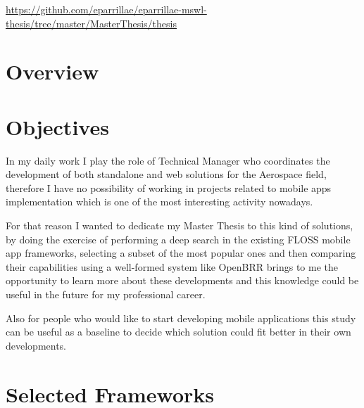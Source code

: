 \documentclass[a4paper,12pt]{book}
\begin{document}
\url{
https://github.com/eparrillae/eparrillae-mswl-thesis/tree/master/MasterThesis/thesis}


\chapter{Overview}
\label{chap:overview}






\chapter{Objectives}
\label{chap:objectives}

In my daily work I play the role of Technical Manager who coordinates the development of both standalone and web solutions for the Aerospace field, therefore I have no possibility of working in projects related to mobile apps implementation which is one of the most interesting activity nowadays.

For that reason I wanted to dedicate my Master Thesis to this kind of solutions, by doing the exercise of performing a deep search in the existing FLOSS mobile app frameworks, selecting a subset of the most popular ones and then comparing their capabilities using a well-formed system like OpenBRR brings to me the opportunity to learn more about these developments and this knowledge could be useful in the future for my professional career.

Also for people who would like to start developing mobile applications this study can be useful as a baseline to decide which solution could fit better in their own developments.


\chapter{Selected Frameworks}
\label{chap:tech}
\end{document}
